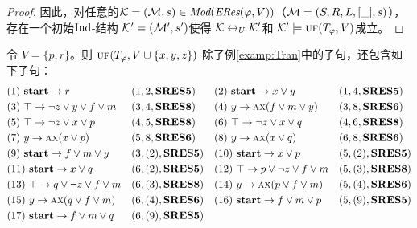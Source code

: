 \begin{proof}
	因此，对任意的${\cal K}=({\cal M}, s)\in \textit{Mod}(\emph{ERes}(\varphi,V))$（${\cal M}=(S, R, L, [\_], s)$），存在一个初始$\textrm{Ind}$-结构 ${\cal K}'=({\cal M}', s')$使得 ${\cal K} \leftrightarrow_{U} {\cal K}'$和 ${\cal K}' \models \textsc{uf}(T_\varphi,V)$成立。
\end{proof}


\begin{example}\label{examp:Res}
	令 $V=\{p,r\}$。则  $\textsc{uf}(T_\varphi, V\cup \{x,y,z\})$ 除了例\ref{examp:Tran}中的子句，还包含如下子句：
	\begin{align*}
		&(1)\ \textbf{start} \rightarrow r && (1,2,\textbf{SRES5})
		&&(2)\ \textbf{start} \rightarrow x \vee y && (1,4,\textbf{SRES5})\\
		&(3)\ \top \rightarrow \neg z \vee y \vee f \vee m && (3, 4, \textbf{SRES8})
		&&(4)\ y \rightarrow \textsc{a}\textsc{x}(f\vee m\vee y) && (3,8, \textbf{SRES6})\\
		&(5)\ \top \rightarrow \neg z \vee x \vee p && (4,5, \textbf{SRES8})
		&&(6)\ \top \rightarrow \neg z \vee x \vee q && (4,6, \textbf{SRES8})\\
		&(7)\ y \rightarrow \textsc{a}\textsc{x}(x\vee p) && (5, 8, \textbf{SRES6})
		&&(8)\ y \rightarrow \textsc{a}\textsc{x}(x\vee q) && (6, 8, \textbf{SRES6})\\
		&(9)\ \textbf{start} \rightarrow f\vee m \vee y && (3,(2), \textbf{SRES5})
		&&(10)\ \textbf{start} \rightarrow x \vee p && (5,(2),\textbf{SRES5}) \\
		&(11)\ \textbf{start} \rightarrow x \vee q && (6,(2), \textbf{SRES5})
		&& (12)\ \top \rightarrow p \vee \neg z \vee f \vee m && (5,(3), \textbf{SRES8})\\
		& (13)\ \top \rightarrow q \vee \neg z \vee f \vee m && (6,(3), \textbf{SRES8})
		&&(14)\ y \rightarrow \textsc{a}\textsc{x}(p \vee f\vee m) && (5, (4), \textbf{SRES6})\\
		&(15)\ y \rightarrow \textsc{a}\textsc{x}(q \vee f\vee m) && (6, (4), \textbf{SRES6})
		&&(16)\ \textbf{start} \rightarrow f\vee m \vee p && (5, (9), \textbf{SRES5}) \\
		&(17)\ \textbf{start} \rightarrow f\vee m \vee q && (6, (9), \textbf{SRES5})
	\end{align*}
	

\end{example}

